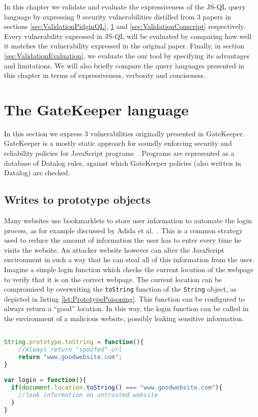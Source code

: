In this chapter we validate and evaluate the expressiveness of the JS-QL query language by expressing 9 security vulnerabilities distilled from 3 papers in sections \ref{sec:ValidationPidginQL}, \ref{sec:ValidationGK} and \ref{sec:ValidationConscript} respectively. Every vulnerability expressed in JS-QL will be evaluated by comparing how well it matches the vulnerability expressed in the original paper. Finally, in section \ref{sec:ValidationEvaluation}, we evaluate the our tool by specifying its advantages and limitations. We will also briefly compare the query languages presented in this chapter in terms of expressiveness, verbosity and conciseness.
\section{The GateKeeper language}
\label{sec:ValidationGK}

In this section we express 3 vulnerabilities originally presented in GateKeeper. GateKeeper is a mostly static approach for soundly enforcing security and reliability policies for JavaScript programs~\cite{GateKeeper}. Programs are represented as a database of Datalog rules, against which GateKeeper policies (also written in Datalog) are checked.

\subsection{Writes to prototype objects}

Many websites use bookmarklets to store user information to automate the login process, as for example discussed by Adida et al.~\cite{PrototypePoisoning}. This is a common strategy used to reduce the amount of information the user has to enter every time he visits the website. An attacker website however can alter the JavaScript environment in such a way that he can steal all of this information from the user. Imagine a simple login function which checks the current location of the webpage to verify that it is on the correct webpage. The current location can be compromised by overwriting the \texttt{toString} function of the \texttt{String} object, as depicted in listing \ref{lst:PrototypePoisoning}. This function can be configured to always return a ``good'' location. In this way, the login function can be called in the environment of a malicious website, possibly leaking sensitive information.

\begin{lstlisting}[label={lst:PrototypePoisoning},language=JavaScript,caption=Prototype poisoning example,mathescape=true]  % float=t?

String.prototype.toString = function(){
    //Always return "spoofed" url
    return "www.goodwebsite.com";
}

var login = function(){
  if(document.location.toString() === "www.goodwebsite.com"){
    //leak information on untrusted website
  }
}
\end{lstlisting}

